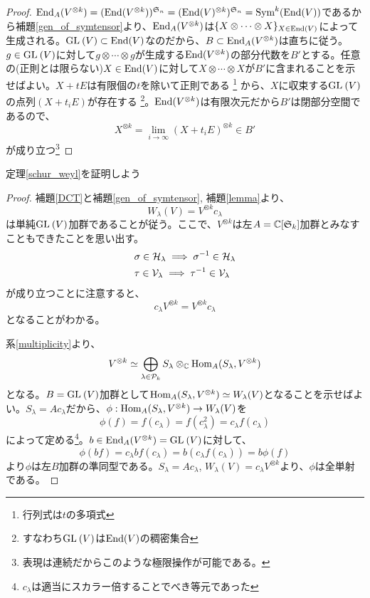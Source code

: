 \documentclass{ltjsreport}
\begin{document}
\begin{proof}
  $\text{End}_A(V^{\otimes k})=(\text{End}(V^{\otimes k}))^{\mathfrak{S}_n}=(\text{End}(V)^{\otimes k})^{\mathfrak{S}_n}=\text{Sym}^k(\text{End}(V))$であるから補題\ref{gen_of_symtensor}より、$\text{End}_A(V^{\otimes k})$は$\{X\otimes\cdots\otimes X\}_{X\in\text{End}(V)}$によって生成される。$\text{GL}\:(V)\subset\text{End}(V)$なのだから、$B\subset \text{End}_A(V^{\otimes k})$は直ちに従う。$g\in\text{GL}\:(V)$に対して$g\otimes \cdots\otimes g$が生成する$\text{End}(V^{\otimes k})$の部分代数を$B'$とする。任意の(正則とは限らない)$X\in\text{End}(V)$に対して$X\otimes \cdots\otimes X$が$B'$に含まれることを示せばよい。$X+tE$は有限個の$t$を除いて正則である
  \footnote{
    行列式は$t$の多項式
  }
  から、$X$に収束する$\text{GL}\:(V)$の点列$(X+t_iE)$が存在する
  \footnote{
    すなわち$\text{GL}\:(V)$は$\text{End}(V)$の稠密集合
  }。$\text{End}(V^{\otimes k})$は有限次元だから$B'$は閉部分空間であるので、
  \[
  X^{\otimes k}=\lim_{i\rightarrow\infty}(X+t_iE)^{\otimes k}\in B'  
  \]
  が成り立つ\footnote{
    表現は連続だからこのような極限操作が可能である。
  }
\end{proof}

定理\ref{schur_weyl}を証明しよう
\begin{proof}
  補題\ref{DCT}と補題\ref{gen_of_symtensor}, 補題\ref{lemma}より、
  \[
  W_\lambda(V)=V^{\otimes k}c_\lambda  
  \]
  は単純$\text{GL}\:(V)$加群であることが従う。ここで、$V^{\otimes k}$は左$A=\mathbb{C}[\mathfrak{S}_k]$加群とみなすこともできたことを思い出す。
  \begin{align*}
    &\sigma\in\mathcal{H}_\lambda\implies\sigma^{-1}\in\mathcal{H}_\lambda\\
    &\tau\in\mathcal{V}_\lambda\implies\tau^{-1}\in\mathcal{V}_\lambda
  \end{align*}
  が成り立つことに注意すると、
  \[
  c_\lambda V^{\otimes k}=V^{\otimes k}c_\lambda  
  \]
  となることがわかる。

  系\ref{multiplicity}より、
  \[
  V^{\otimes k}\simeq \bigoplus_{\lambda\in\mathcal{P}_k}S_\lambda\otimes_{\mathbb{C}}\text{Hom}_A(S_\lambda,V^{\otimes k})  
  \]
  となる。$B=\text{GL}\:(V)$加群として$\text{Hom}_A(S_\lambda,V^{\otimes k})\simeq W_\lambda(V)$となることを示せばよい。$S_\lambda=Ac_\lambda$だから、$\phi:\text{Hom}_A(S_\lambda,V^{\otimes k})\rightarrow W_\lambda(V)$を
  \[
    \phi(f)=f(c_\lambda)=f(c_\lambda^2)=c_\lambda f(c_\lambda)
  \]
  によって定める\footnote{$c_\lambda$は適当にスカラー倍することでべき等元であった}。$b\in\text{End}_A(V^{\otimes k})=\text{GL}\:(V)$に対して、
  \[
  \phi(bf)=c_\lambda bf(c_\lambda)=b(c_\lambda f(c_\lambda))=b\phi(f)
  \]
  より$\phi$は左$B$加群の準同型である。$S_\lambda=Ac_\lambda$, $W_\lambda(V)=c_\lambda V^{\otimes k}$より、$\phi$は全単射である。
\end{proof}
\end{document}

